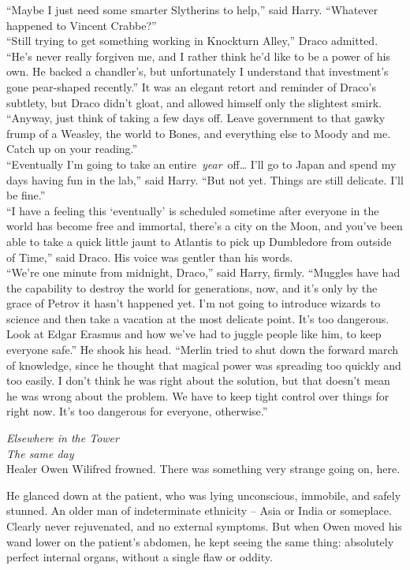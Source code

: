``Maybe I just need some smarter Slytherins to help,'' said Harry.
``Whatever happened to Vincent Crabbe?'' \\
``Still trying to get something working in Knockturn Alley,'' Draco
admitted. ``He's never really forgiven me, and I rather think he'd like
to be a power of his own. He backed a chandler's, but unfortunately I
understand that investment's gone pear-shaped recently.'' It was an
elegant retort and reminder of Draco's subtlety, but Draco didn't gloat,
and allowed himself only the slightest smirk. ``Anyway, just think of
taking a few days off. Leave government to that gawky frump of a
Weasley, the world to Bones, and everything else to Moody and me. Catch
up on your reading.'' \\
``Eventually I'm going to take an entire~\emph{year}~off\ldots{} I'll go
to Japan and spend my days having fun in the lab,'' said Harry. ``But
not yet. Things are still delicate. I'll be fine.'' \\
``I have a feeling this `eventually' is scheduled sometime after
everyone in the world has become free and immortal, there's a city on
the Moon, and you've been able to take a quick little jaunt to Atlantis
to pick up Dumbledore from outside of Time,'' said Draco. His voice was
gentler than his words. \\
``We're one minute from midnight, Draco,'' said Harry, firmly. ``Muggles
have had the capability to destroy the world for generations, now, and
it's only by the grace of Petrov it hasn't happened yet. I'm not going
to introduce wizards to science and then take a vacation at the most
delicate point. It's too dangerous. Look at Edgar Erasmus and how we've
had to juggle people like him, to keep everyone safe.'' He shook his
head. ``Merlin tried to shut down the forward march of knowledge, since
he thought that magical power was spreading too quickly and too easily.
I don't think he was right about the solution, but that doesn't mean he
was wrong about the problem. We have to keep tight control over things
for right now. It's too dangerous for everyone, otherwise.'' \\

\mybreak

\emph{Elsewhere in the Tower}\\
\emph{The same day}\\

Healer Owen Wilifred frowned. There was something very strange going on,
here.

He glanced down at the patient, who was lying unconscious, immobile, and
safely stunned. An older man of indeterminate ethnicity -- Asia or India
or someplace. Clearly never rejuvenated, and no external symptoms. But
when Owen moved his wand lower on the patient's abdomen, he kept seeing
the same thing: absolutely perfect internal organs, without a single
flaw or oddity.

